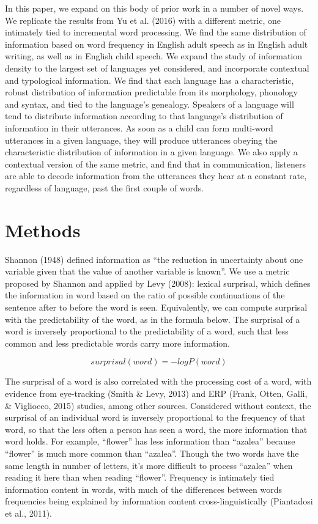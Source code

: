\documentclass[11pt,]{article}
\begin{document}
In this paper, we expand on this body of prior work in a number of novel ways. We replicate the results from Yu et al. (2016) with a different metric, one intimately tied to incremental word processing. We find the same distribution of information based on word frequency in English adult speech as in English adult writing, as well as in English child speech. We expand the study of information density to the largest set of languages yet considered, and incorporate contextual and typological information. We find that each language has a characteristic, robust distribution of information predictable from its morphology, phonology and syntax, and tied to the language's genealogy. Speakers of a language will tend to distribute information according to that language's distribution of information in their utterances. As soon as a child can form multi-word utterances in a given language, they will produce utterances obeying the characteristic distribution of information in a given language. We also apply a contextual version of the same metric, and find that in communication, listeners are able to decode information from the utterances they hear at a constant rate, regardless of language, past the first couple of words.

\hypertarget{methods}{%
\section{Methods}\label{methods}}

Shannon (1948) defined information as ``the reduction in uncertainty about one variable given that the value of another variable is known''. We use a metric proposed by Shannon and applied by Levy (2008): lexical surprisal, which defines the information in word based on the ratio of possible continuations of the sentence after to before the word is seen. Equivalently, we can compute surprisal with the predictability of the word, as in the formula below. The surprisal of a word is inversely proportional to the predictability of a word, such that less common and less predictable words carry more information.

\[surprisal(word) = -log P(word)\]

The surprisal of a word is also correlated with the processing cost of a word, with evidence from eye-tracking (Smith \& Levy, 2013) and ERP (Frank, Otten, Galli, \& Vigliocco, 2015) studies, among other sources. Considered without context, the surprisal of an individual word is inversely proportional to the frequency of that word, so that the less often a person has seen a word, the more information that word holds. For example, ``flower'' has less information than ``azalea'' because ``flower'' is much more common than ``azalea''. Though the two words have the same length in number of letters, it's more difficult to process ``azalea'' when reading it here than when reading ``flower''. Frequency is intimately tied information content in words, with much of the differences between words frequencies being explained by information content cross-linguistically (Piantadosi et al., 2011).
\end{document}
